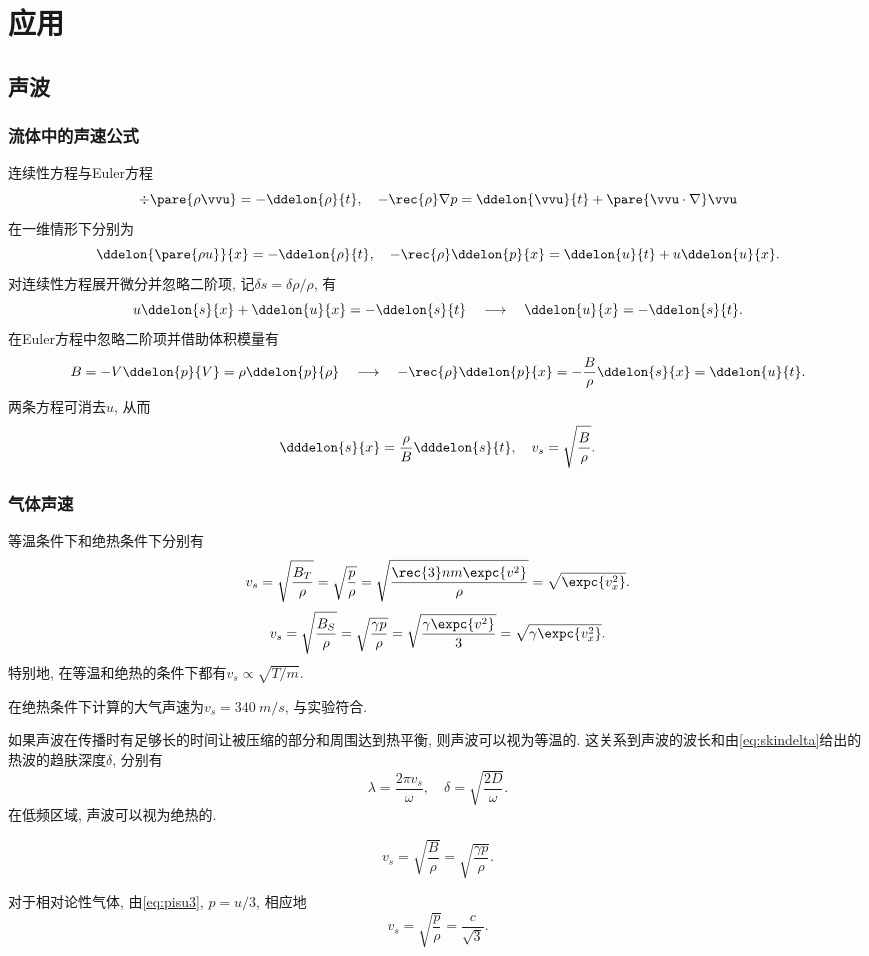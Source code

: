 \documentclass[../Thermal.tex]{subfiles}
\begin{document}
\section{应用}
\subsection{声波}
\subsubsection{流体中的声速公式}
连续性方程与Euler方程
\[ \div\pare{\rho\vvu} = -\ddelon{\rho}{t},\quad -\rec{\rho}\nabla p = \ddelon{\vvu}{t} + \pare{\vvu\cdot\nabla} \vvu \]
在一维情形下分别为
\[ \ddelon{\pare{\rho u}}{x} = -\ddelon{\rho}{t},\quad -\rec{\rho}\ddelon{p}{x} = \ddelon{u}{t} + u\ddelon{u}{x}. \]
对连续性方程展开微分并忽略二阶项, 记$\delta s = \delta \rho/\rho$, 有
\[ u\ddelon{s}{x} + \ddelon{u}{x} = -\ddelon{s}{t}\quad\longrightarrow\quad \ddelon{u}{x} = -\ddelon{s}{t}. \]
在Euler方程中忽略二阶项并借助体积模量有
\[ B = -V\ddelon{p}{V} = \rho\ddelon{p}{\rho}\quad\longrightarrow\quad -\rec{\rho}\ddelon{p}{x} = -\frac{B}{\rho}\ddelon{s}{x} = \ddelon{u}{t}. \]
两条方程可消去$u$, 从而
\[ \dddelon{s}{x} = \frac{\rho}{B}\dddelon{s}{t},\quad v_s = \sqrt{\frac{B}{\rho}}. \]
\subsubsection{气体声速}
等温条件下和绝热条件下分别有
\[ v_s = \sqrt{\frac{B_T}{\rho}} = \sqrt{\frac{p}{\rho}} = \sqrt{\frac{\rec{3}nm\expc{v^2}}{\rho}} = \sqrt{\expc{v_x^2}}. \]
\[ v_s = \sqrt{\frac{B_S}{\rho}} = \sqrt{\frac{\gamma p}{\rho}} = \sqrt{\frac{\gamma\expc{v^2}}{3}} = \sqrt{\gamma\expc{v_x^2}}. \]
特别地, 在等温和绝热的条件下都有$v_s\propto \sqrt{T/m}$.
\begin{ex}
在绝热条件下计算的大气声速为$v_s=\SI{340}{m/s}$, 与实验符合.
\end{ex}
如果声波在传播时有足够长的时间让被压缩的部分和周围达到热平衡, 则声波可以视为等温的. 这关系到声波的波长和由\eqref{eq:skindelta}给出的热波的趋肤深度$\delta$, 分别有
\[ \lambda = \frac{2\pi v_s}{\omega},\quad \delta = \sqrt{\frac{2D}{\omega}}. \]
在低频区域, 声波可以视为绝热的.
\begin{finale}
\begin{equation}
\label{eq:speedofsound}
v_s = \sqrt{\frac{B}{\rho}} = \sqrt{\frac{\gamma p}{\rho}}.
\end{equation}
\end{finale}
\begin{ex}
对于相对论性气体, 由\eqref{eq:pisu3}, $p = u/3$, 相应地
\[ v_s = \sqrt{\frac{p}{\rho}} = \frac{c}{\sqrt{3}}. \]
\end{ex}
\end{document}
